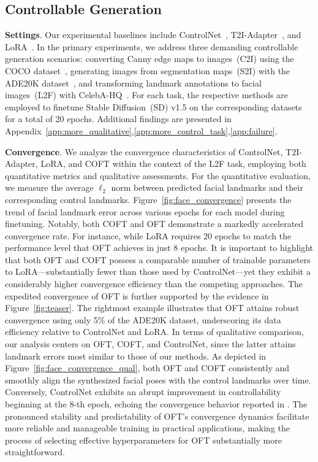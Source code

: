 \subsection{Controllable Generation}

\textbf{Settings}. Our experimental baselines include ControlNet~\cite{zhang2023adding}, T2I-Adapter~\cite{mou2023t2i}, and LoRA~\cite{hulora2022}. In the primary experiments, we address three demanding controllable generation scenarios: converting Canny edge maps to images~(C2I) using the COCO dataset~\cite{lin2014microsoft}, generating images from segmentation maps~(S2I) with the ADE20K dataset~\cite{zhou2017scene}, and transforming landmark annotations to facial images~(L2F) with CelebA-HQ~\cite{karras2018progressive,xia2021tedigan}. For each task, the respective methods are employed to finetune Stable Diffusion~(SD) v1.5 on the corresponding datasets for a total of 20 epochs. Additional findings are presented in Appendix~\ref{app:more_qualitative},\ref{app:more_control_task},\ref{app:failure}.

\textbf{Convergence}. We analyze the convergence characteristics of ControlNet, T2I-Adapter, LoRA, and COFT within the context of the L2F task, employing both quantitative metrics and qualitative assessments. For the quantitative evaluation, we measure the average $\ell_2$ norm between predicted facial landmarks and their corresponding control landmarks. Figure~\ref{fig:face_convergence} presents the trend of facial landmark error across various epochs for each model during finetuning. Notably, both COFT and OFT demonstrate a markedly accelerated convergence rate. For instance, while LoRA requires 20 epochs to match the performance level that OFT achieves in just 8 epochs. It is important to highlight that both OFT and COFT possess a comparable number of trainable parameters to LoRA—substantially fewer than those used by ControlNet—yet they exhibit a considerably higher convergence efficiency than the competing approaches. The expedited convergence of OFT is further supported by the evidence in Figure~\ref{fig:teaser}. The rightmost example illustrates that OFT attains robust convergence using only 5\% of the ADE20K dataset, underscoring its data efficiency relative to ControlNet and LoRA. In terms of qualitative comparison, our analysis centers on OFT, COFT, and ControlNet, since the latter attains landmark errors most similar to those of our methods. As depicted in Figure~\ref{fig:face_convergence_qual}, both OFT and COFT consistently and smoothly align the synthesized facial poses with the control landmarks over time. Conversely, ControlNet exhibits an abrupt improvement in controllability beginning at the 8-th epoch, echoing the convergence behavior reported in \cite{zhang2023adding}. The pronounced stability and predictability of OFT's convergence dynamics facilitate more reliable and manageable training in practical applications, making the process of selecting effective hyperparameters for OFT substantially more straightforward.

